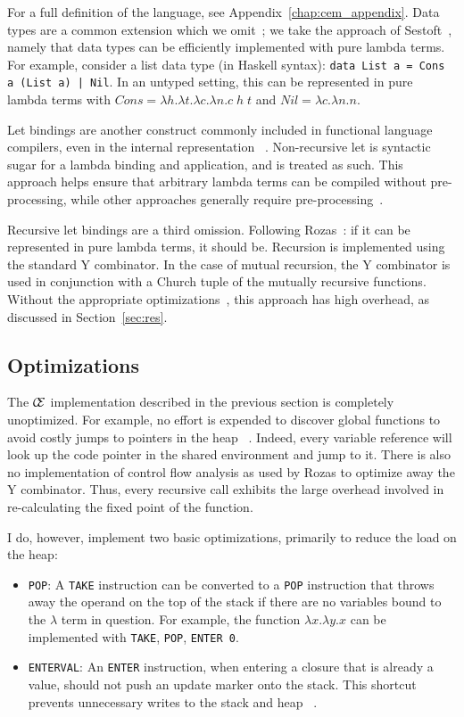 For a full definition of the language, see Appendix~\ref{chap:cem_appendix}.
Data types are a common extension which we omit~\cite{jonesstg,boquist1997grin};
we take the approach of Sestoft~\cite{sestoft}, namely that data types can be
efficiently implemented with pure lambda terms. For example, consider a list
data type (in Haskell syntax): \texttt{data List a = Cons a (List a) | Nil}.
In an untyped setting, this can be represented in pure lambda terms with
$\mathit{Cons} = \lambda h.\lambda t.\lambda c.\lambda n.c \; h \; t$ and
$\mathit{Nil} = \lambda c.\lambda n.n$. 

Let bindings are another construct commonly included in functional
language compilers, even in the internal representation
~\cite{boquist1997grin,jonesstg}.  Non-recursive let is syntactic sugar for a
lambda binding and application, and is treated as such. This approach helps
ensure that arbitrary lambda terms can be compiled without pre-processing, while
other approaches generally require pre-processing~\cite{sestoft,TIM}.

Recursive let bindings are a third omission. Following
Rozas~\cite{rozas1992taming}: if it can be represented in pure lambda terms, it
should be. Recursion is implemented using the standard Y combinator. In the
case of mutual recursion, the Y combinator is used in conjunction with a Church
tuple of the mutually recursive functions. Without the appropriate
optimizations~\cite{rozas1992taming}, this approach has high overhead, as
discussed in Section~\ref{sec:res}.

\subsection{Optimizations}

The $\mathcal{C} \mskip -4mu \mathcal{E}$ implementation described in the previous section is 
completely unoptimized. For example, no effort is expended to
discover global functions to avoid costly jumps to pointers in the heap
~\cite{jonesstg}. Indeed, every variable reference will look up the code pointer
in the shared environment and jump to it. There is also no implementation of 
control flow analysis as used by Rozas to optimize away the Y combinator.  Thus,
every recursive call exhibits the large overhead involved in re-calculating the
fixed point of the function.  

I do, however, implement two basic optimizations, primarily to reduce the load
on the heap:

\begin{itemize}
\item \texttt{POP}: A \texttt{TAKE} instruction can be converted to a \texttt{POP}
instruction that throws away the operand on the top of the stack if there are no
variables bound to the $\lambda$ term in question. For example, the function
$\lambda x.\lambda y.x$ can be implemented with \texttt{TAKE}, \texttt{POP},
\texttt{ENTER 0}.  
\item \texttt{ENTERVAL}: An \texttt{ENTER} instruction, when entering a
closure that is already a value, should not push an update marker onto the
stack. This shortcut prevents unnecessary writes to the stack and heap
~\cite{jonesstg,lkm,sestoft}.  
\end{itemize}

